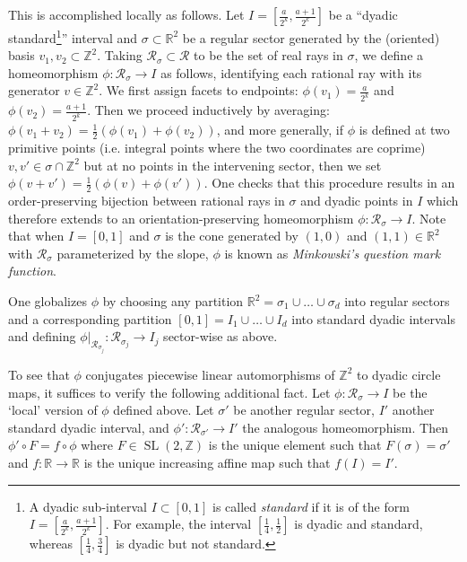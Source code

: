 \documentclass[11pt]{amsart}
\theoremstyle{definition}
\theoremstyle{plain}
\theoremstyle{remark}
\numberwithin{equation}{section}
\DeclareMathOperator{\SL}{SL}
\def\R{\mathbb{R}}
\def\Z{\mathbb{Z}}
\def\RR{{\mathcal{R}}}
\begin{document}
This is accomplished locally as follows.  Let $I = [\frac{a}{2^k},\frac{a+1}{2^k}]$ be a ``dyadic standard\footnote{A dyadic sub-interval $I\subset[0,1]$ is called {\em standard} if it is of the form $I = [\frac{a}{2^k},\frac{a+1}{2^k}]$. For example, the interval $[\frac 1 4,\frac 1 2]$ is dyadic and standard, whereas $[\frac 1 4,\frac 3 4]$ is dyadic but not standard. }''
interval and $\sigma\subset \R^2$ be a regular sector generated by the (oriented) basis $v_1,v_2\subset \Z^2$.   Taking $\RR_\sigma\subset \RR$ to be the set of real rays in $\sigma$, we define a homeomorphism $\phi:\RR_\sigma\to I$ as follows, identifying each rational ray with its generator $v\in\Z^2$.  We first assign facets to endpoints: $\phi(v_1) = \frac{a}{2^k}$ and $\phi(v_2) = \frac{a+1}{2^k}$.  Then we proceed inductively by averaging: $\phi(v_1+v_2) = \frac12(\phi(v_1) + \phi(v_2))$, and more generally, if $\phi$ is defined at two primitive points (i.e. integral points where the two coordinates are coprime) $v,v'\in\sigma\cap \Z^2$ but at no points in the intervening sector, then we set $\phi(v+v') = \frac12(\phi(v)+\phi(v'))$.  One checks that this procedure results in an order-preserving bijection between rational rays in $\sigma$ and dyadic points in $I$ which therefore extends to an orientation-preserving homeomorphism $\phi:\RR_\sigma \to I$.  Note that when $I=[0,1]$ and $\sigma$ is the cone generated by $(1,0)$ and $(1,1)\in\R^2$ with $\RR_\sigma$ parameterized by the slope, $\phi$ is known as \emph{Minkowski's question mark function}.  

One globalizes $\phi$ by choosing any partition $\R^2 = \sigma_1\cup\dots\cup\sigma_d$ into regular sectors and a corresponding partition $[0,1]=I_1\cup\dots\cup I_d$ into standard dyadic intervals and defining $\phi|_{\RR_{\sigma_j}}:\RR_{\sigma_j}\to I_j$ sector-wise as above.  

To see that $\phi$ conjugates piecewise linear automorphisms of $\Z^2$ to dyadic circle maps, it suffices to verify the following additional fact.  Let $\phi:\RR_\sigma \to I$ be the `local' version of $\phi$ defined above.  Let $\sigma'$ be another regular sector, $I'$ another standard dyadic interval, and $\phi':\RR_{\sigma'}\to I'$ the analogous homeomorphism.  Then $\phi'\circ F = f\circ \phi$ where $F\in \SL(2,\Z)$ is the unique element such that $F(\sigma) = \sigma'$ and $f:\R\to\R$ is the unique increasing affine map such that $f(I) = I'$.
\end{document}
